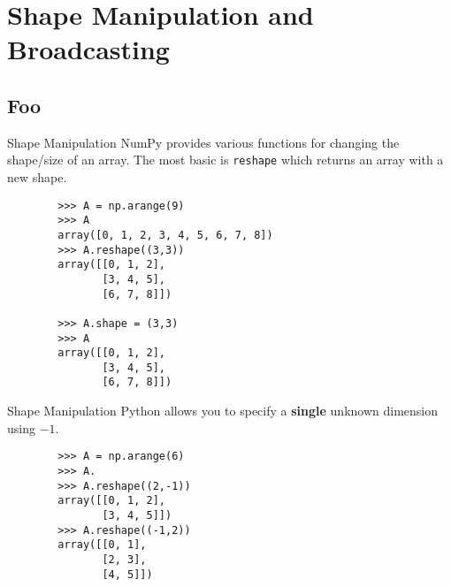 \documentclass[serif,xcolor=pdftex,dvipsnames,table,hyperref={bookmarks=false,breaklinks}]{beamer}
\begin{document}
\lstset{style=custompython}

\maketitlepage
%
%

\section{Shape Manipulation and Broadcasting}
\subsection{Foo}

\begin{frame}[t,fragile]{Shape Manipulation}
	NumPy provides various functions for changing the shape/size of an array. The most basic is \verb|reshape| which returns an array with a new shape.
	\pause
	\begin{lstlisting}
		>>> A = np.arange(9)
		>>> A
		array([0, 1, 2, 3, 4, 5, 6, 7, 8])
		>>> A.reshape((3,3))
		array([[0, 1, 2],
		       [3, 4, 5],
		       [6, 7, 8]])
			   
		>>> A.shape = (3,3)
		>>> A
		array([[0, 1, 2],
		       [3, 4, 5],
		       [6, 7, 8]])
	\end{lstlisting}
\end{frame}

\begin{frame}[t]{Shape Manipulation}
	\centering
	\texttt{[image: \{../Figures/array\_slicing/Slide7]}.png}
\end{frame}

\begin{frame}[t,fragile]{Shape Manipulation}
	Python allows you to specify a \textbf{single} unknown dimension using $-1$.
	\pause
	\begin{lstlisting}
		>>> A = np.arange(6)
		>>> A.
		>>> A.reshape((2,-1))
		array([[0, 1, 2],
		       [3, 4, 5]])
		>>> A.reshape((-1,2))
		array([[0, 1],
		       [2, 3],
		       [4, 5]])
	\end{lstlisting}
\end{frame}
\end{document}
